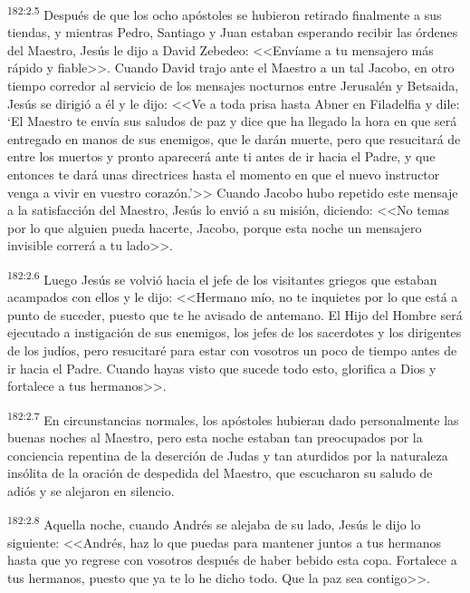 \par 
\textsuperscript{182:2.5} Después de que los ocho apóstoles se hubieron retirado finalmente a sus tiendas, y mientras Pedro, Santiago y Juan estaban esperando recibir las órdenes del Maestro, Jesús le dijo a David Zebedeo: <<Envíame a tu mensajero más rápido y fiable>>. Cuando David trajo ante el Maestro a un tal Jacobo, en otro tiempo corredor al servicio de los mensajes nocturnos entre Jerusalén y Betsaida, Jesús se dirigió a él y le dijo: <<Ve a toda prisa hasta Abner en Filadelfia y dile: `El Maestro te envía sus saludos de paz y dice que ha llegado la hora en que será entregado en manos de sus enemigos, que le darán muerte, pero que resucitará de entre los muertos y pronto aparecerá ante ti antes de ir hacia el Padre, y que entonces te dará unas directrices hasta el momento en que el nuevo instructor venga a vivir en vuestro corazón.'>> Cuando Jacobo hubo repetido este mensaje a la satisfacción del Maestro, Jesús lo envió a su misión, diciendo: <<No temas por lo que alguien pueda hacerte, Jacobo, porque esta noche un mensajero invisible correrá a tu lado>>.

\par 
\textsuperscript{182:2.6} Luego Jesús se volvió hacia el jefe de los visitantes griegos que estaban acampados con ellos y le dijo: <<Hermano mío, no te inquietes por lo que está a punto de suceder, puesto que te he avisado de antemano. El Hijo del Hombre será ejecutado a instigación de sus enemigos, los jefes de los sacerdotes y los dirigentes de los judíos, pero resucitaré para estar con vosotros un poco de tiempo antes de ir hacia el Padre. Cuando hayas visto que sucede todo esto, glorifica a Dios y fortalece a tus hermanos>>.

\par 
\textsuperscript{182:2.7} En circunstancias normales, los apóstoles hubieran dado personalmente las buenas noches al Maestro, pero esta noche estaban tan preocupados por la conciencia repentina de la deserción de Judas y tan aturdidos por la naturaleza insólita de la oración de despedida del Maestro, que escucharon su saludo de adiós y se alejaron en silencio.

\par 
\textsuperscript{182:2.8} Aquella noche, cuando Andrés se alejaba de su lado, Jesús le dijo lo siguiente: <<Andrés, haz lo que puedas para mantener juntos a tus hermanos hasta que yo regrese con vosotros después de haber bebido esta copa. Fortalece a tus hermanos, puesto que ya te lo he dicho todo. Que la paz sea contigo>>.

